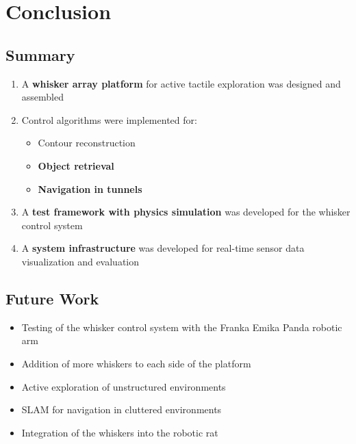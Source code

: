

\chapter{Conclusion}

\section{Summary}

\begin{enumerate}
    \item A \textbf{whisker array platform} for active tactile exploration was designed and assembled
    \item Control algorithms were implemented for:
    \begin{itemize}
        \item Contour reconstruction
        \item \textbf{Object retrieval}
        \item \textbf{Navigation in tunnels}
    \end{itemize}
    \item A \textbf{test framework with physics simulation} was developed for the whisker control system
    \item A \textbf{system infrastructure} was developed for real-time sensor data visualization and evaluation
\end{enumerate}

\section{Future Work}
\begin{itemize}
    \item Testing of the whisker control system with the Franka Emika Panda robotic arm
    \item Addition of more whiskers to each side of the platform
    \item Active exploration of unstructured environments
    \item SLAM for navigation in cluttered environments
    \item Integration of the whiskers into the robotic rat
\end{itemize}
